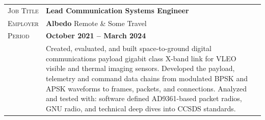 \documentclass[a4paper, oneside, final]{scrartcl}
\newcommand{\gray}{\rowcolor[gray]{.90}} %
\begin{document}
\begin{center}
\begin{tabularx}{0.97\linewidth}{>{\raggedleft\scshape}p{2cm}X}
\gray Job Title & \textbf{Lead Communication Systems Engineer}\\
\gray Employer & \textbf{Albedo} \hfill Remote \& Some Travel\\
\gray Period & \textbf{October 2021 -- March 2024}\\
&
\vspace{-0.15 cm}
Created, evaluated, and built space-to-ground digital communications payload gigabit class X-band link for VLEO visible and thermal imaging sensors. Developed the payload, telemetry and command data chains from modulated BPSK and APSK waveforms to frames, packets, and connections. Analyzed and tested with: software defined AD9361-based packet radios, GNU radio, and technical deep dives into CCSDS standards.%

\end{tabularx}
\end{center}
\end{document}

